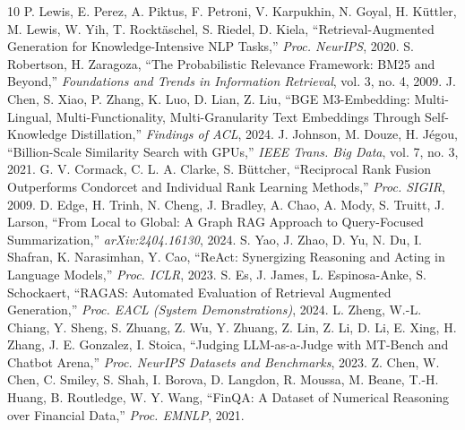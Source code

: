 \documentclass[conference]{IEEEtran}
\begin{document}
\begin{thebibliography}{10}
\small
\setlength{\itemsep}{0pt}
 P. Lewis, E. Perez, A. Piktus, F. Petroni, V. Karpukhin, N. Goyal, H. Küttler, M. Lewis, W. Yih, T. Rocktäschel, S. Riedel, D. Kiela, ``Retrieval-Augmented Generation for Knowledge-Intensive NLP Tasks,'' \textit{Proc. NeurIPS}, 2020.
 S. Robertson, H. Zaragoza, ``The Probabilistic Relevance Framework: BM25 and Beyond,'' \textit{Foundations and Trends in Information Retrieval}, vol. 3, no. 4, 2009.
 J. Chen, S. Xiao, P. Zhang, K. Luo, D. Lian, Z. Liu, ``BGE M3-Embedding: Multi-Lingual, Multi-Functionality, Multi-Granularity Text Embeddings Through Self-Knowledge Distillation,'' \textit{Findings of ACL}, 2024.
 J. Johnson, M. Douze, H. Jégou, ``Billion-Scale Similarity Search with GPUs,'' \textit{IEEE Trans. Big Data}, vol. 7, no. 3, 2021.
 G. V. Cormack, C. L. A. Clarke, S. Büttcher, ``Reciprocal Rank Fusion Outperforms Condorcet and Individual Rank Learning Methods,'' \textit{Proc. SIGIR}, 2009.
 D. Edge, H. Trinh, N. Cheng, J. Bradley, A. Chao, A. Mody, S. Truitt, J. Larson, ``From Local to Global: A Graph RAG Approach to Query-Focused Summarization,'' \textit{arXiv:2404.16130}, 2024.
 S. Yao, J. Zhao, D. Yu, N. Du, I. Shafran, K. Narasimhan, Y. Cao, ``ReAct: Synergizing Reasoning and Acting in Language Models,'' \textit{Proc. ICLR}, 2023.
 S. Es, J. James, L. Espinosa-Anke, S. Schockaert, ``RAGAS: Automated Evaluation of Retrieval Augmented Generation,'' \textit{Proc. EACL (System Demonstrations)}, 2024.
 L. Zheng, W.-L. Chiang, Y. Sheng, S. Zhuang, Z. Wu, Y. Zhuang, Z. Lin, Z. Li, D. Li, E. Xing, H. Zhang, J. E. Gonzalez, I. Stoica, ``Judging LLM-as-a-Judge with MT-Bench and Chatbot Arena,'' \textit{Proc. NeurIPS Datasets and Benchmarks}, 2023.
 Z. Chen, W. Chen, C. Smiley, S. Shah, I. Borova, D. Langdon, R. Moussa, M. Beane, T.-H. Huang, B. Routledge, W. Y. Wang, ``FinQA: A Dataset of Numerical Reasoning over Financial Data,'' \textit{Proc. EMNLP}, 2021.
\end{thebibliography}
\end{document}
